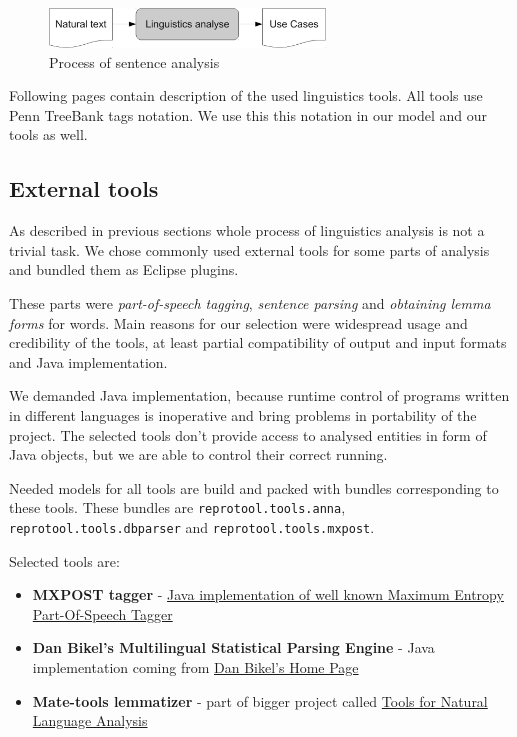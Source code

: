 \begin{figure}[ht]
  \centering
  \includegraphics[height=30pt]{images/LinguisticsAnalyseSmall}
  \caption{Process of sentence analysis}
  \label{fig:LinguisticsAnalyseSmall}
\end{figure}

Following pages contain description of the used linguistics tools. All tools use Penn TreeBank tags notation. We use this this notation in our model and our tools as well.

\subsection{External tools}
\label{sec:externaltools}
As described in previous sections whole process of linguistics analysis is not a trivial task. We chose commonly used external tools for some parts of analysis and bundled them as Eclipse plugins.

These parts were \emph{part-of-speech tagging}, \emph{sentence parsing} and \emph{obtaining lemma forms} for words. Main reasons for our selection were widespread usage and credibility of the tools, at least partial compatibility of output and input formats and Java implementation. 

We demanded Java implementation, because runtime control of programs written in different languages is inoperative and bring problems in portability of the project. The selected tools don't provide access to analysed entities in form of Java objects, but we are able to control their correct running.

Needed models for all tools are build and packed with bundles corresponding to these tools. These bundles are \verb|reprotool.tools.anna|,  \verb|reprotool.tools.dbparser| and \verb|reprotool.tools.mxpost|.


Selected tools are:
 
\begin{itemize}
\item {\bf MXPOST tagger} - \href{http://www.inf.ed.ac.uk/resources/nlp/local_doc/MXPOST.html}{Java implementation of well known Maximum Entropy Part-Of-Speech Tagger}
\item {\bf Dan Bikel's Multilingual Statistical Parsing Engine } - Java implementation coming from \href{http://www.cis.upenn.edu/~dbikel/software.html#stat-parser}{Dan Bikel’s Home Page}
\item {\bf Mate-tools lemmatizer} - part of bigger project called \href{http://code.google.com/p/mate-tools/}{Tools for Natural Language Analysis}
\end{itemize}

